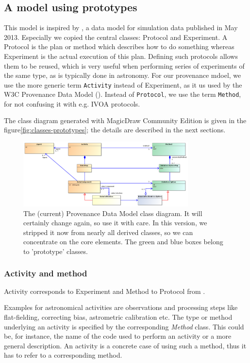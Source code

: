 \documentclass[11pt,a4paper]{ivoa}
\begin{document}
\subsection{A model using prototypes}
This model is inspired by \cite{std:SimDM}, a data model for simulation data published in May 2013. Especially we copied the central classes: Protocol and Experiment.  A Protocol is the plan or method
which describes how to do something whereas Experiment is the actual execution of
this plan. Defining such protocols allows them to be reused, which is very useful when performing series of experiments of the same type, as is typically done in astronomy. For our provenance mdoel, we use the more generic term
\texttt{Activity} instead of Experiment, as it us used by the W3C Provenance Data Model (\cite{std:W3CProvDM}). Instead of \texttt{Protocol}, we use the term \texttt{Method}, 
for not confusing it with e.g. IVOA protocols.

The class diagram generated with MagicDraw Community Edition is given in the figure\ref{fig:classes-prototypes}; the details are described in the next sections.

\begin{figure}
\centering
\includegraphics[width=0.8\textwidth]{ProvDM-classdiagram-prototypes.png}
\caption{The (current) Provenance Data Model
class diagram. It will certainly change again, so use it with care. In this version, we stripped it now from nearly all derived classes, so we can concentrate on the core elements. The green and blue boxes belong to 'prototype' classes.}
\label{fig:w3cclasses}
\end{figure}

\subsubsection{Activity and method}
Activity corresponds to Experiment and Method to Protocol from \cite{std:SimDM}.

Examples for astronomical activities are observations and processing steps like
flat-fielding, correcting bias, astrometric calibration etc. The type or method
underlying an activity is specified by the corresponding \emph{Method} class.
This could be, for instance, the name of the code used to perform an activity or a more general description. An activity is a concrete case of using such a method, thus it has to refer to a corresponding method. 
\end{document}
